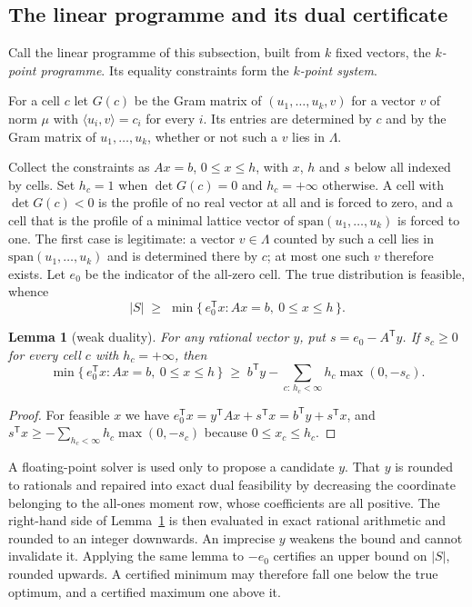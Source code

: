 \documentclass[11pt]{amsart}
\newtheorem{lemma}[theorem]{Lemma}
\theoremstyle{remark}
\newcommand{\ip}[2]{\langle #1,#2\rangle}
\begin{document}
\subsection{The linear programme and its dual certificate}\label{ss:cert}

Call the linear programme of this subsection, built from $k$ fixed vectors, the
\emph{$k$-point programme}. Its equality constraints form the \emph{$k$-point
system}.

For a cell $c$ let $G(c)$ be the Gram matrix of $(u_1,\dots,u_k,v)$ for a vector
$v$ of norm $\mu$ with $\ip{u_i}{v}=c_i$ for every $i$. Its entries are
determined by $c$ and by the Gram matrix of $u_1,\dots,u_k$, whether or not such
a $v$ lies in $\Lambda$.

Collect the constraints as $Ax=b$, $0\le x\le h$, with $x$, $h$ and $s$ below all
indexed by cells. Set $h_c=1$ when $\det G(c)=0$ and $h_c=+\infty$ otherwise. A cell with
$\det G(c)<0$ is the profile of no real vector at all and is forced to zero, and a
cell that is the profile of a minimal lattice vector of
$\mathrm{span}(u_1,\dots,u_k)$ is forced to one.
The first case is legitimate: a vector $v\in\Lambda$ counted by such a cell lies
in $\mathrm{span}(u_1,\dots,u_k)$ and is determined there by $c$; at most one
such $v$ therefore exists. Let $e_0$ be the indicator of the all-zero cell. The
true distribution is feasible, whence
\[
  |S| \;\ge\; \min\{\, e_0^{\mathsf T}x : Ax=b,\ 0\le x\le h \,\}.
\]

\begin{lemma}[weak duality]\label{lem:dual}
For any rational vector $y$, put $s=e_0-A^{\mathsf T}y$. If $s_c\ge0$ for every
cell $c$ with $h_c=+\infty$, then
\[
  \min\{\,e_0^{\mathsf T}x : Ax=b,\ 0\le x\le h\,\}
  \;\ge\;
  b^{\mathsf T}y-\sum_{c:\,h_c<\infty}h_c\max(0,-s_c).
\]
\end{lemma}

\begin{proof}
For feasible $x$ we have
$e_0^{\mathsf T}x=y^{\mathsf T}Ax+s^{\mathsf T}x=b^{\mathsf T}y+s^{\mathsf T}x$,
and $s^{\mathsf T}x\ge-\sum_{h_c<\infty}h_c\max(0,-s_c)$ because
$0\le x_c\le h_c$.
\end{proof}

A floating-point solver is used only to propose a candidate $y$. That $y$ is
rounded to rationals and repaired into exact dual feasibility by decreasing the
coordinate belonging to the all-ones moment row, whose coefficients are all
positive. The right-hand side of Lemma~\ref{lem:dual} is then evaluated in exact
rational arithmetic and rounded to an integer downwards. An imprecise $y$ weakens
the bound and cannot invalidate it. Applying the same lemma to $-e_0$ certifies an
upper bound on $|S|$, rounded upwards. A certified minimum may therefore fall one
below the true optimum, and a certified maximum one above it.
\end{document}
